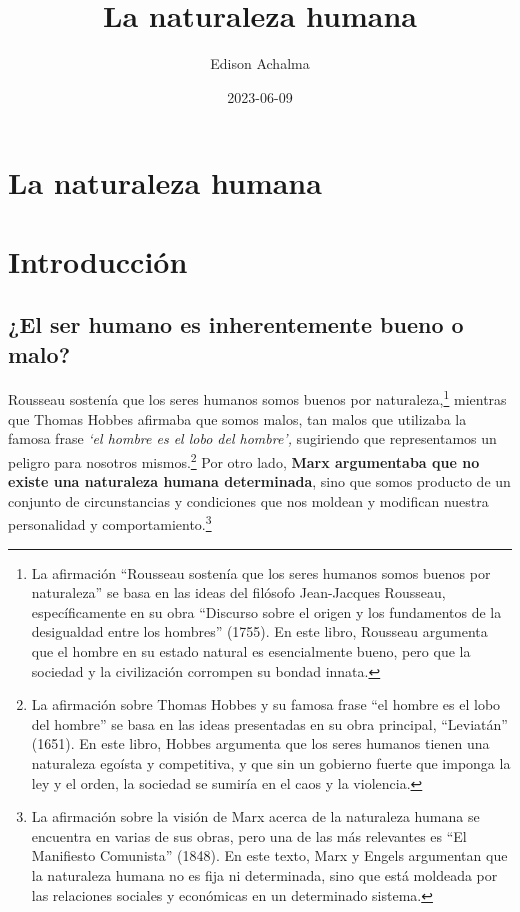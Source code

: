 \documentclass[
  jou,
  floatsintext,
  longtable,
  a4paper,
  nolmodern,
  notxfonts,
  notimes,
  12pt,
  colorlinks=true,linkcolor=blue,citecolor=blue,urlcolor=blue]{apa7}
\title{La naturaleza humana}
\author{Edison Achalma}
\affiliation{
{Escuela Profesional de Economía, Universidad Nacional de San Cristóbal
de Huamanga}}
\date{2023-06-09}
\begin{document}
\maketitle


\hypertarget{toc}{}
\tableofcontents
\newpage
\section[Introduction]{La naturaleza humana}

\setcounter{secnumdepth}{3}

\setlength\LTleft{0pt}




\section{Introducción}\label{introducciuxf3n}

\subsection{¿El ser humano es inherentemente bueno o
malo?}\label{el-ser-humano-es-inherentemente-bueno-o-malo}

Rousseau sostenía que los seres humanos somos buenos por
naturaleza,\footnote{La afirmación ``Rousseau sostenía que los seres
  humanos somos buenos por naturaleza'' se basa en las ideas del
  filósofo Jean-Jacques Rousseau, específicamente en su obra ``Discurso
  sobre el origen y los fundamentos de la desigualdad entre los
  hombres'' (1755). En este libro, Rousseau argumenta que el hombre en
  su estado natural es esencialmente bueno, pero que la sociedad y la
  civilización corrompen su bondad innata.} mientras que Thomas Hobbes
afirmaba que somos malos, tan malos que utilizaba la famosa frase
\emph{`el hombre es el lobo del hombre',} sugiriendo que representamos
un peligro para nosotros mismos.\footnote{La afirmación sobre Thomas
  Hobbes y su famosa frase ``el hombre es el lobo del hombre'' se basa
  en las ideas presentadas en su obra principal, ``Leviatán'' (1651). En
  este libro, Hobbes argumenta que los seres humanos tienen una
  naturaleza egoísta y competitiva, y que sin un gobierno fuerte que
  imponga la ley y el orden, la sociedad se sumiría en el caos y la
  violencia.} Por otro lado, \textbf{Marx argumentaba que no existe una
naturaleza humana determinada}, sino que somos producto de un conjunto
de circunstancias y condiciones que nos moldean y modifican nuestra
personalidad y comportamiento.\footnote{La afirmación sobre la visión de
  Marx acerca de la naturaleza humana se encuentra en varias de sus
  obras, pero una de las más relevantes es ``El Manifiesto Comunista''
  (1848). En este texto, Marx y Engels argumentan que la naturaleza
  humana no es fija ni determinada, sino que está moldeada por las
  relaciones sociales y económicas en un determinado sistema.}
\end{document}
